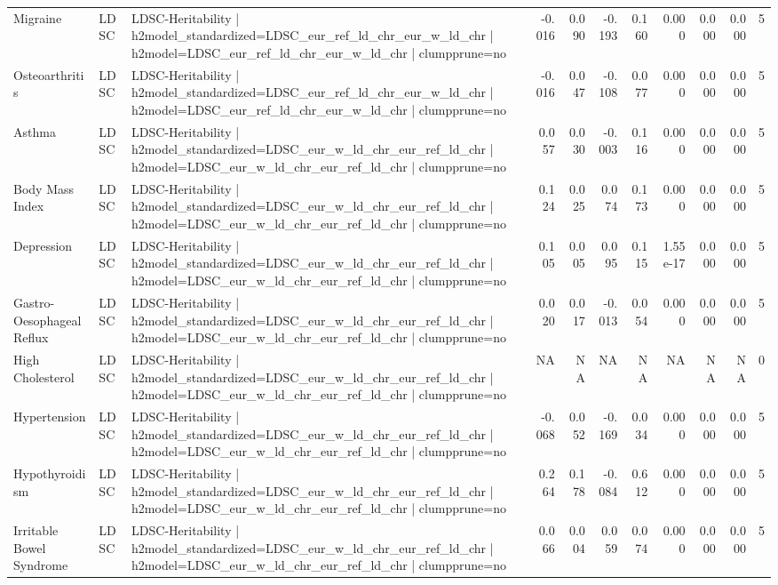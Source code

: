 \begin{landscape}
\begin{longtable}{p{2.4cm}p{1.8cm}p{6.0cm}rrrrrrrr}
Migraine & LDSC & LDSC-Heritability | h2model\_standardized=LDSC\_eur\_ref\_ld\_chr\_eur\_w\_ld\_chr | h2model=LDSC\_eur\_ref\_ld\_chr\_eur\_w\_ld\_chr | clumpprune=no & -0.016 & 0.090 & -0.193 & 0.160 & 0.000 & 0.000 & 0.000 & 5 \\
Osteoarthritis & LDSC & LDSC-Heritability | h2model\_standardized=LDSC\_eur\_ref\_ld\_chr\_eur\_w\_ld\_chr | h2model=LDSC\_eur\_ref\_ld\_chr\_eur\_w\_ld\_chr | clumpprune=no & -0.016 & 0.047 & -0.108 & 0.077 & 0.000 & 0.000 & 0.000 & 5 \\
Asthma & LDSC & LDSC-Heritability | h2model\_standardized=LDSC\_eur\_w\_ld\_chr\_eur\_ref\_ld\_chr | h2model=LDSC\_eur\_w\_ld\_chr\_eur\_ref\_ld\_chr | clumpprune=no & 0.057 & 0.030 & -0.003 & 0.116 & 0.000 & 0.000 & 0.000 & 5 \\
Body Mass Index & LDSC & LDSC-Heritability | h2model\_standardized=LDSC\_eur\_w\_ld\_chr\_eur\_ref\_ld\_chr | h2model=LDSC\_eur\_w\_ld\_chr\_eur\_ref\_ld\_chr | clumpprune=no & 0.124 & 0.025 & 0.074 & 0.173 & 0.000 & 0.000 & 0.000 & 5 \\
Depression & LDSC & LDSC-Heritability | h2model\_standardized=LDSC\_eur\_w\_ld\_chr\_eur\_ref\_ld\_chr | h2model=LDSC\_eur\_w\_ld\_chr\_eur\_ref\_ld\_chr | clumpprune=no & 0.105 & 0.005 & 0.095 & 0.115 & 1.55e-17 & 0.000 & 0.000 & 5 \\
Gastro-Oesophageal Reflux & LDSC & LDSC-Heritability | h2model\_standardized=LDSC\_eur\_w\_ld\_chr\_eur\_ref\_ld\_chr | h2model=LDSC\_eur\_w\_ld\_chr\_eur\_ref\_ld\_chr | clumpprune=no & 0.020 & 0.017 & -0.013 & 0.054 & 0.000 & 0.000 & 0.000 & 5 \\
High Cholesterol & LDSC & LDSC-Heritability | h2model\_standardized=LDSC\_eur\_w\_ld\_chr\_eur\_ref\_ld\_chr | h2model=LDSC\_eur\_w\_ld\_chr\_eur\_ref\_ld\_chr | clumpprune=no & NA & NA & NA & NA & NA & NA & NA & 0 \\
Hypertension & LDSC & LDSC-Heritability | h2model\_standardized=LDSC\_eur\_w\_ld\_chr\_eur\_ref\_ld\_chr | h2model=LDSC\_eur\_w\_ld\_chr\_eur\_ref\_ld\_chr | clumpprune=no & -0.068 & 0.052 & -0.169 & 0.034 & 0.000 & 0.000 & 0.000 & 5 \\
Hypothyroidism & LDSC & LDSC-Heritability | h2model\_standardized=LDSC\_eur\_w\_ld\_chr\_eur\_ref\_ld\_chr | h2model=LDSC\_eur\_w\_ld\_chr\_eur\_ref\_ld\_chr | clumpprune=no & 0.264 & 0.178 & -0.084 & 0.612 & 0.000 & 0.000 & 0.000 & 5 \\
Irritable Bowel Syndrome & LDSC & LDSC-Heritability | h2model\_standardized=LDSC\_eur\_w\_ld\_chr\_eur\_ref\_ld\_chr | h2model=LDSC\_eur\_w\_ld\_chr\_eur\_ref\_ld\_chr | clumpprune=no & 0.066 & 0.004 & 0.059 & 0.074 & 0.000 & 0.000 & 0.000 & 5 \\

\end{longtable}
\end{landscape}
